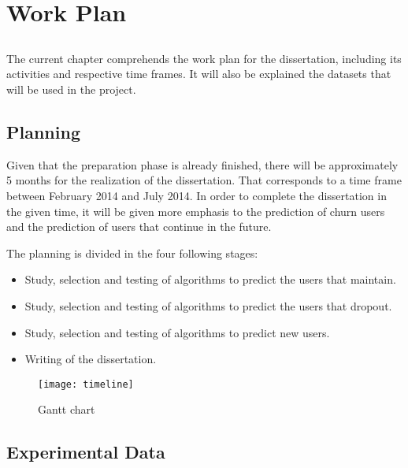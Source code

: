 \chapter{Work Plan}\label{chap:chap3}

\section*{}

The current chapter comprehends the work plan for the dissertation, including its activities and respective time frames.
It will also be explained the datasets that will be used in the project.

\section{Planning}

Given that the preparation phase is already finished, there will be approximately 5 months for the realization of the dissertation.
That corresponds to a time frame between February 2014 and July 2014. In order to complete the dissertation in the given time, it will be given more emphasis to the
prediction of churn users and the prediction of users that continue in the future.

The planning is divided in the four following stages:
\begin{itemize}
  \item Study, selection and testing of algorithms to predict the users that maintain.
  \item Study, selection and testing of algorithms to predict the users that dropout.
  \item Study, selection and testing of algorithms to predict new users.
  \item Writing of the dissertation.
\end{itemize}

\begin{figure}[h]
  \begin{center}
    \leavevmode
    \texttt{[image: timeline]}
    \caption{Gantt chart}
    \label{fig:Timeline}
  \end{center}
\end{figure}



\section{Experimental Data}

